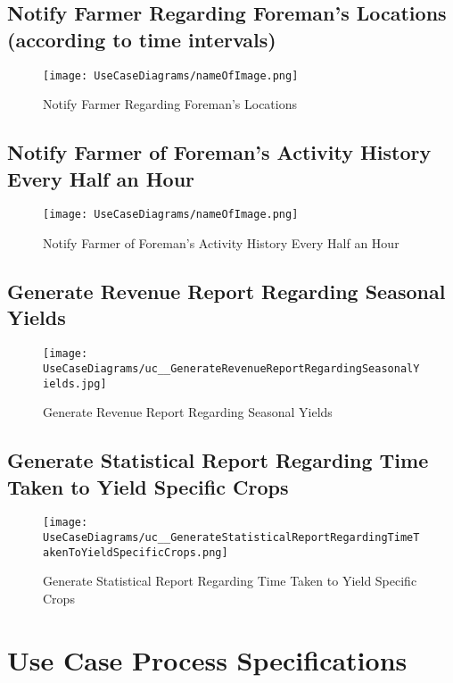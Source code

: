 \documentclass[11pt,fleqn]{book} %
\begin{document}
	\section{Notify Farmer Regarding Foreman’s Locations (according to time intervals)}
	\begin{figure}
		\texttt{[image: UseCaseDiagrams/nameOfImage.png]}
		\caption{Notify Farmer Regarding Foreman’s Locations}
	\end{figure}
	
	\section{Notify Farmer of Foreman’s Activity History Every Half an Hour}
	\begin{figure}
		\texttt{[image: UseCaseDiagrams/nameOfImage.png]}
		\caption{Notify Farmer of Foreman’s Activity History Every Half an Hour}
	\end{figure}
	
	\section{Generate Revenue Report Regarding Seasonal Yields}
	\begin{figure}
		\texttt{[image: UseCaseDiagrams/uc\_\_GenerateRevenueReportRegardingSeasonalYields.jpg]}
		\caption{Generate Revenue Report Regarding Seasonal Yields}
	\end{figure}
	
	\section{Generate Statistical Report Regarding Time Taken to Yield Specific Crops}
	\begin{figure}
		\texttt{[image: UseCaseDiagrams/uc\_\_GenerateStatisticalReportRegardingTimeTakenToYieldSpecificCrops.png]}
		\caption{Generate Statistical Report Regarding Time Taken to Yield Specific Crops}
	\end{figure}



\chapter{Use Case Process Specifications} %
\end{document}
